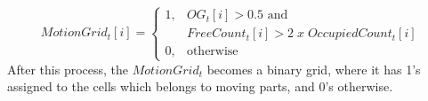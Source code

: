 \begin{equation}
MotionGrid_t[i] = \begin{cases} 1, & \mbox{$OG_t[i] > 0.5$ and} \\ & \mbox {$FreeCount_t[i]>2\;  x \; OccupiedCount_t[i]$} \\
                                0, & \mbox{otherwise}\end{cases}
\end{equation}
After this process, the $MotionGrid_t$ becomes a binary grid, where it has 1's assigned to the cells which belongs to moving parts, and 0's otherwise.








